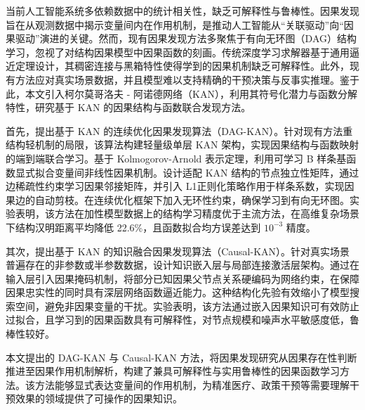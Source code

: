\begin{cabstract}
当前人工智能系统多依赖数据中的统计相关性，缺乏可解释性与鲁棒性。因果发现旨在从观测数据中揭示变量间内在作用机制，是推动人工智能从“关联驱动”向“因果驱动”演进的关键。然而，现有因果发现方法多聚焦于有向无环图（DAG）结构学习，忽视了对结构因果模型中因果函数的刻画。传统深度学习求解器基于通用逼近定理设计，其稠密连接与黑箱特性使得学到的因果机制缺乏可解释性。此外，现有方法应对真实场景数据，并且模型难以支持精确的干预决策与反事实推理。鉴于此，本文引入柯尔莫哥洛夫 - 阿诺德网络（KAN），利用其符号化潜力与函数分解特性，研究基于 KAN 的因果结构与函数联合发现方法。

首先，提出基于 KAN 的连续优化因果发现算法（DAG-KAN）。针对现有方法重结构轻机制的局限，该算法构建轻量级单层 KAN 架构，实现因果结构与函数映射的端到端联合学习。基于 Kolmogorov-Arnold 表示定理，利用可学习 B 样条基函数显式拟合变量间非线性因果机制。设计适配 KAN 结构的节点独立性矩阵，通过边稀疏性约束学习因果邻接矩阵，并引入 L1正则化策略作用于样条系数，实现因果边的自动剪枝。在连续优化框架下加入无环性约束，确保学习到有向无环图。实验表明，该方法在加性模型数据上的结构学习精度优于主流方法，在高维复杂场景下结构汉明距离平均降低 22.6\%，且函数拟合均方误差达到 $10^{-3}$ 精度。

其次，提出基于 KAN 的知识融合因果发现算法（Causal-KAN）。针对真实场景普遍存在的非参数或半参数数据，设计知识嵌入层与局部连接激活层架构。通过在输入层引入因果掩码机制，将部分已知因果父节点关系硬编码为网络约束，在保障因果忠实性的同时具有深层网络函数逼近能力。这种结构化先验有效缩小了模型搜索空间，避免非因果变量的干扰。实验表明，该方法通过嵌入因果知识可有效防止过拟合，且学习到的因果函数具有可解释性，对节点规模和噪声水平敏感度低，鲁棒性较好。

本文提出的 DAG-KAN 与 Causal-KAN 方法，将因果发现研究从因果存在性判断推进至因果作用机制解析，构建了兼具可解释性与实用鲁棒性的因果函数学习方法。该方法能够显式表达变量间的作用机制，为精准医疗、政策干预等需要理解干预效果的领域提供了可操作的因果知识。
\end{cabstract}

